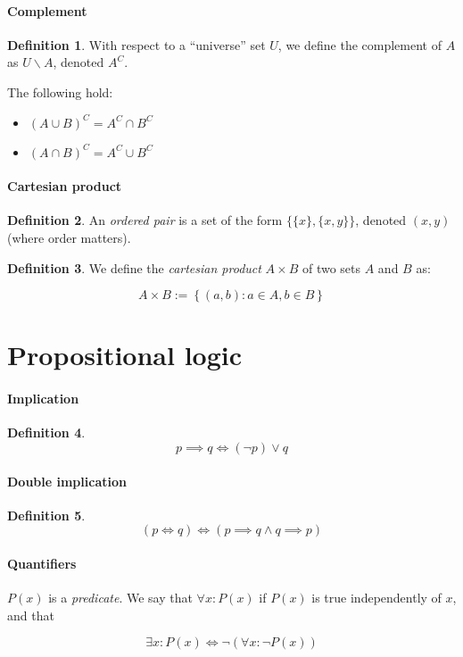 \documentclass[12pt,a4paper]{report}
\numberwithin{equation}{section}
\theoremstyle{definition}
\newtheorem{definition}{Definition}[section]
\theoremstyle{remark}
\begin{document}
\paragraph{Complement}

\begin{definition}
With respect to a ``universe'' set $U$, we define the complement of $A$ as $U \smallsetminus A$, denoted $A^C$.
\end{definition}

The following hold:

\begin{itemize}
\item $(A \cup B)^C = A^C \cap B^C$
\item $(A \cap B)^C = A^C \cup B^C$
\end{itemize}

\paragraph{Cartesian product}

\begin{definition}
An \emph{ordered pair} is a set of the form $\lbrace \lbrace x \rbrace , \lbrace x, y \rbrace \rbrace$, denoted $(x, y)$ (where order matters).
\end{definition}

\begin{definition}
We define the \emph{cartesian product} $A\times B$ of two sets $A$ and $B$ as:

\begin{equation}
A\times B := \left\lbrace (a, b) : a \in A, b \in B \right\rbrace
\end{equation}
\end{definition}

\section{Propositional logic}

\paragraph{Implication}
\begin{definition}
\begin{equation}
p\implies q \iff (\neg p ) \vee q
\end{equation}
\end{definition}

\paragraph{Double implication}
\begin{definition}
\begin{equation}
(p \iff q) \iff (p \implies q \wedge q \implies p )
\end{equation}
\end{definition}

\paragraph{Quantifiers}

$P(x)$ is a \emph{predicate}. We say that $\forall x : P(x)$ if $P(x)$ is true independently of $x$, and that

\begin{equation}
\exists x : P(x) \iff \neg ( \forall x : \neg P(x) )
\end{equation}

\tableofcontents
\end{document}
